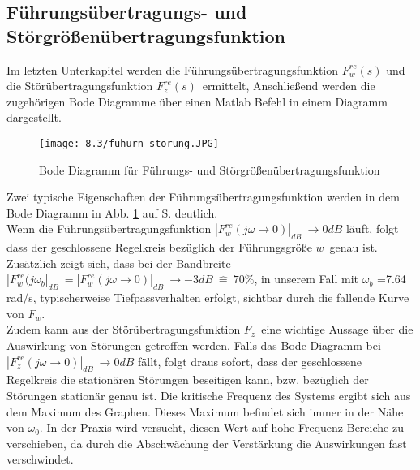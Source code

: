 \documentclass[12pt,a4paper]{scrartcl}	%
\begin{document}
\subsection{Führungsübertragungs- und Störgrößenübertragungsfunktion}
Im letzten Unterkapitel werden die Führungsübertragungsfunktion $F_w^{re}(s)$ und die Störübertragungsfunktion $F_z^{re}(s)$~ermittelt,
Anschließend werden die zugehörigen Bode Diagramme über einen Matlab Befehl in einem Diagramm dargestellt.\\
\begin{figure}[tbh]
	\centering
	\texttt{[image: 8.3/fuhurn\_storung.JPG]}
	\caption{Bode Diagramm für Führungs- und Störgrößenübertragungsfunktion }
	\label{w}
\end{figure}
Zwei typische Eigenschaften der Führungsübertragungsfunktion werden in dem Bode Diagramm in Abb. \ref{w} auf S. \pageref{w} deutlich.\\
Wenn die Führungsübertragungsfunktion $|F_w^{re}(j\omega \rightarrow 0)|_{dB}~ \rightarrow 0 dB$ läuft, folgt dass der geschlossene Regelkreis bezüglich der Führungsgröße $w$~genau ist.\\
Zusätzlich zeigt sich, dass bei der Bandbreite $|F_w^{re}(j\omega_b|_{dB}~ = |F_w^{re}(j\omega \rightarrow 0)|_{dB}~ \rightarrow -3 dB~\widehat{=}~70\%$, in unserem Fall mit $\omega_b$ =7.64 rad/s, typischerweise Tiefpassverhalten erfolgt, sichtbar durch die fallende Kurve von $F_w$.\\
Zudem kann aus der Störübertragungsfunktion $F_z$~eine wichtige Aussage über die Auswirkung von Störungen getroffen werden. Falls das Bode Diagramm bei \mbox{$|F_z^{re}(j\omega \rightarrow 0)|_{dB}~ \rightarrow 0 dB$} fällt, folgt draus sofort, dass der geschlossene Regelkreis die stationären Störungen beseitigen kann, bzw. bezüglich der Störungen stationär genau ist. Die kritische Frequenz des Systems ergibt sich aus dem Maximum des Graphen. Dieses Maximum befindet sich immer in der Nähe von $\omega_0$. In der Praxis wird versucht, diesen Wert auf hohe Frequenz Bereiche zu verschieben, da durch die Abschwächung der Verstärkung die Auswirkungen fast verschwindet. 
\end{document}
